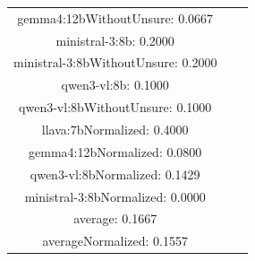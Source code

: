\documentclass[a4paper]{article}
\begin{document}
\begin{tabular}{ccc}
gemma4:12bWithoutUnsure: 0.0667 \\ ministral-3:8b: 0.2000 \\ ministral-3:8bWithoutUnsure: 0.2000 \\ qwen3-vl:8b: 0.1000 \\ qwen3-vl:8bWithoutUnsure: 0.1000 \\ llava:7bNormalized: 0.4000 \\ gemma4:12bNormalized: 0.0800 \\ qwen3-vl:8bNormalized: 0.1429 \\ ministral-3:8bNormalized: 0.0000 \\ average: 0.1667 \\ averageNormalized: 0.1557 \end{minipage}\\
\end{tabular}

\vspace{5mm}
\end{document}
